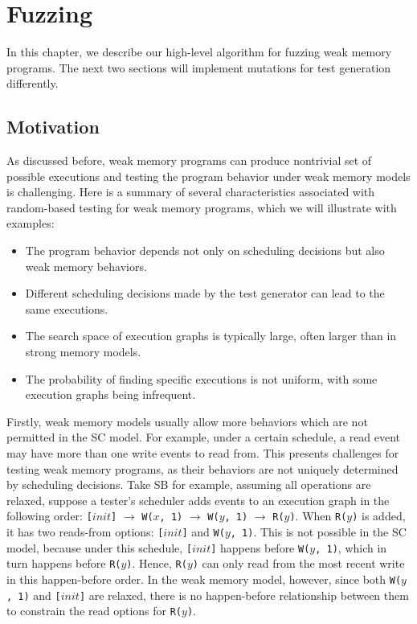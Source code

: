 \chapter{\label{cha:fuzz}Fuzzing}

In this chapter, we describe our high-level algorithm for fuzzing weak memory programs. The next two sections will implement mutations for test generation differently.

\section{Motivation}

As discussed before, weak memory programs can produce nontrivial set of possible executions and testing the program behavior under weak memory models is challenging.
Here is a summary of several characteristics associated with random-based testing for weak memory programs, which we will illustrate with examples:
\begin{itemize}
    \item The program behavior depends not only on scheduling decisions but also weak memory behaviors.
    \item Different scheduling decisions made by the test generator can lead to the same executions. 
    \item The search space of execution graphs is typically large, often larger than in strong memory models.
    \item The probability of finding specific executions is not uniform, with some execution graphs being infrequent.
    
\end{itemize}


Firstly, weak memory models usually allow more behaviors which are not permitted in the SC model. For example, under a certain schedule, a read event may have more than one write events to read from. This presents challenges for testing weak memory programs, as their behaviors are not uniquely determined by scheduling decisions. Take SB for example, assuming all operations are relaxed, suppose a tester's scheduler adds events to an execution graph in the following order: \texttt{[$init$]} $\rightarrow$ \texttt{W($x$, 1)} $\rightarrow$ \texttt{W($y$, 1)} $\rightarrow$ \texttt{R($y$)}. When \texttt{R($y$)} is added, it has two reads-from options: \texttt{[$init$]} and \texttt{W($y$, 1)}. This is not possible in the SC model, because under this schedule, \texttt{[$init$]} happens before \texttt{W($y$, 1)}, which in turn happens before \texttt{R($y$)}. Hence, \texttt{R($y$)} can only read from the most recent write in this happen-before order. In the weak memory model, however, since both \texttt{W($y$, 1)} and \texttt{[$init$]} are relaxed, there is no happen-before relationship between them to constrain the read options for \texttt{R($y$)}.

